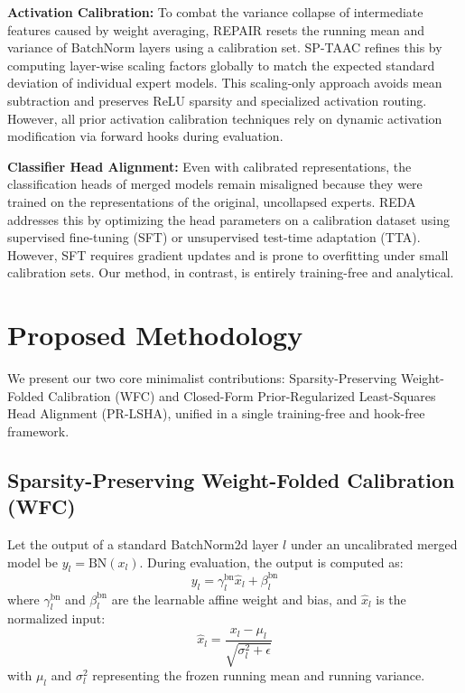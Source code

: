 \documentclass{article}
\theoremstyle{plain}
\theoremstyle{definition}
\theoremstyle{remark}
\begin{document}
\textbf{Activation Calibration:} To combat the variance collapse of intermediate features caused by weight averaging, REPAIR \cite{jordan2022repair} resets the running mean and variance of BatchNorm layers using a calibration set. SP-TAAC refines this by computing layer-wise scaling factors globally to match the expected standard deviation of individual expert models. This scaling-only approach avoids mean subtraction and preserves ReLU sparsity and specialized activation routing. However, all prior activation calibration techniques rely on dynamic activation modification via forward hooks during evaluation.

\textbf{Classifier Head Alignment:} Even with calibrated representations, the classification heads of merged models remain misaligned because they were trained on the representations of the original, uncollapsed experts. REDA \cite{tang2024fusionbench} addresses this by optimizing the head parameters on a calibration dataset using supervised fine-tuning (SFT) or unsupervised test-time adaptation (TTA). However, SFT requires gradient updates and is prone to overfitting under small calibration sets. Our method, in contrast, is entirely training-free and analytical.

\section{Proposed Methodology}
\label{sec:method}

We present our two core minimalist contributions: Sparsity-Preserving Weight-Folded Calibration (WFC) and Closed-Form Prior-Regularized Least-Squares Head Alignment (PR-LSHA), unified in a single training-free and hook-free framework.

\subsection{Sparsity-Preserving Weight-Folded Calibration (WFC)}
\label{sec:wfc}

Let the output of a standard BatchNorm2d layer $l$ under an uncalibrated merged model be $y_l = \text{BN}(x_l)$. During evaluation, the output is computed as:
\begin{equation}
    y_l = \gamma^{\text{bn}}_l \hat{x}_l + \beta^{\text{bn}}_l
\end{equation}
where $\gamma^{\text{bn}}_l$ and $\beta^{\text{bn}}_l$ are the learnable affine weight and bias, and $\hat{x}_l$ is the normalized input:
\begin{equation}
    \hat{x}_l = \frac{x_l - \mu_l}{\sqrt{\sigma^2_l + \epsilon}}
\end{equation}
with $\mu_l$ and $\sigma^2_l$ representing the frozen running mean and running variance.
\end{document}
